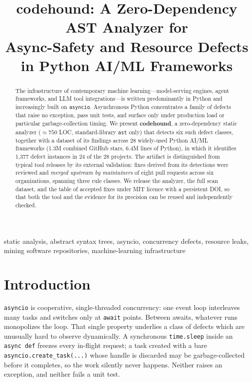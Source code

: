 \documentclass[conference]{IEEEtran}
\begin{document}
\title{codehound: A Zero-Dependency AST Analyzer for\\Async-Safety and Resource Defects in Python AI/ML Frameworks}

\author{
}

\maketitle

\begin{abstract}
The infrastructure of contemporary machine learning---model-serving engines, agent frameworks, and LLM tool integrations---is written predominantly in Python and increasingly built on \texttt{asyncio}. Asynchronous Python concentrates a family of defects that raise no exception, pass unit tests, and surface only under production load or particular garbage-collection timing. We present \textbf{codehound}, a zero-dependency static analyzer (${\approx}750$ LOC, standard-library \texttt{ast} only) that detects six such defect classes, together with a dataset of its findings across 28 widely-used Python AI/ML frameworks (1.3M combined GitHub stars, 6.4M lines of Python), in which it identifies 1{,}377 defect instances in 24 of the 28 projects. The artifact is distinguished from typical tool releases by its external validation: fixes derived from its detections were reviewed and \emph{merged upstream by maintainers} of eight pull requests across six organizations, spanning three rule classes. We release the analyzer, the full scan dataset, and the table of accepted fixes under MIT licence with a persistent DOI, so that both the tool and the evidence for its precision can be reused and independently checked.
\end{abstract}

\begin{IEEEkeywords}
static analysis, abstract syntax trees, asyncio, concurrency defects, resource leaks, mining software repositories, machine-learning infrastructure
\end{IEEEkeywords}

\section{Introduction}
\texttt{asyncio} is cooperative, single-threaded concurrency: one event loop interleaves many tasks and switches only at \texttt{await} points. Between awaits, whatever runs monopolizes the loop. That single property underlies a class of defects which are unusually hard to observe dynamically. A synchronous \texttt{time.sleep} inside an \texttt{async def} freezes every in-flight request; a task created with a bare \texttt{asyncio.create\_task(...)} whose handle is discarded may be garbage-collected before it completes, so the work silently never happens. Neither raises an exception, and neither fails a unit test.
\end{document}
